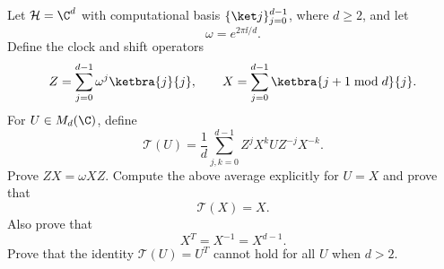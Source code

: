 Let $\mathcal H=\C^d$ with computational basis $\{\ket j\}_{j=0}^{d-1}$, where $d\geq2$, and let
$$
    \omega=e^{2\pi\ii/d}.
$$
Define the clock and shift operators
$$
    Z
    =
    \sum_{j=0}^{d-1}\omega^j\ketbra{j}{j},
    \qquad
    X
    =
    \sum_{j=0}^{d-1}
    \ketbra{j+1\bmod d}{j}.
$$
For $U\in M_d(\C)$, define
$$
    \mathcal T(U)
    =
    \frac1d
    \sum_{j,k=0}^{d-1}
    Z^jX^kUZ^{-j}X^{-k}.
$$
Prove $ZX=\omega XZ$.  Compute the above average explicitly for $U=X$ and prove that
$$
    \mathcal T(X)=X.
$$
Also prove that
$$
    X^T=X^{-1}=X^{d-1}.
$$
Prove that the identity $\mathcal T(U)=U^T$ cannot hold for all $U$ when $d>2$.
